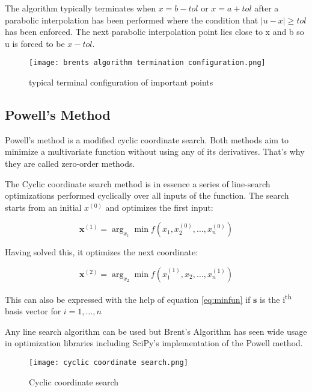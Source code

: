 The algorithm typically terminates when $x = b - tol$ or
$x = a + tol$ after a parabolic interpolation has been performed where
the condition that $|u - x| \geq tol$ has been enforced. The next
parabolic interpolation point lies close to x and b so u is forced to be
$x - tol$.

\begin{figure}[H]
    \centering
    \texttt{[image: brents algorithm termination configuration.png]}
    \caption{typical terminal configuration of important points \cite{brent1973}}
\end{figure}

\subsection{Powell's Method}
\label{powells-method}

Powell's method is a modified cyclic coordinate search. Both methods aim
to minimize a multivariate function without using any of its
derivatives. That's why they are called zero-order methods.

The Cyclic coordinate search method is in essence a series of
line-search optimizations performed cyclically over all inputs of the
function. The search starts from an initial $x^{(0)}$ and optimizes
the first input:

\begin{equation}
\mathbf{x}^{(1)} = \arg_{x_{1}}{\min{f\left( x_{1},x_{2}^{(0)},\ldots,x_{n}^{(0)} \right)}}
\end{equation}

Having solved this, it optimizes the next coordinate:

\begin{equation}
\mathbf{x}^{(2)} = \arg_{x_{2}}{\min{f\left( x_{1}^{(1)},x_{2},\ldots,x_{n}^{(1)} \right)}}
\end{equation}

This can also be expressed with the help of equation \eqref{eq:minfun} if
$\mathbf{s}$ is the i\textsuperscript{th} basis vector for
$i = 1,\ldots,n$

Any line search algorithm can be used but Brent's Algorithm has seen
wide usage in optimization libraries including SciPy's implementation of
the Powell method.

\begin{figure}[H]
    \centering
    \texttt{[image: cyclic coordinate search.png]}
    \caption{Cyclic coordinate search \cite{kochenderfer2019}}
    \label{fig:CCsearch}
\end{figure}

